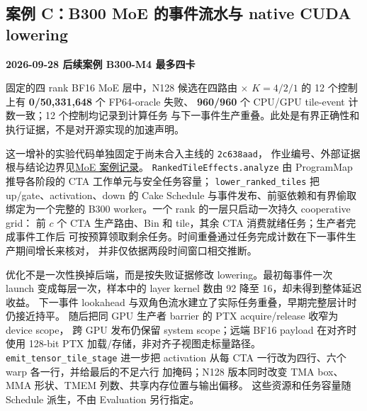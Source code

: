 \documentclass[UTF8,11pt,a4paper,fontset=none]{ctexart}
\newcommand{\code}[1]{\texttt{#1}}
\newcommand{\weaverepo}[2]{\href{https://github.com/qhy991/open-cake-ir/blob/93d052021cc3b4b0d8a5580837f7d87bbbd2fc02/#1}{#2}}
\begin{document}
\subsection{案例 C：B300 MoE 的事件流水与 native CUDA lowering}\label{sec:weave-case}
\begin{notebox}
\noindent\textbf{2026-09-28 后续案例 \quad B300-M4 \quad 最多四卡}\par
\noindent\small 固定的四 rank BF16 MoE 层中，N128 候选在四路由 $\times$
$K=4/2/1$ 的 12 个控制上有 \textbf{0/50,331,648} 个 FP64-oracle 失败、
\textbf{960/960} 个 CPU/GPU tile-event 计数一致；12 个控制均记录到计算任务
与下一事件生产重叠。此处是有界正确性和执行证据，不是对开源实现的加速声明。
\end{notebox}

这一增补的实验代码单独固定于尚未合入主线的 \code{2c638aad}，
作业编号、外部证据根与结论边界见\weaverepo{docs/WEAVE_CASE_STUDY.md}{MoE 案例记录}。
\code{RankedTileEffects.analyze}
由 ProgramMap 推导各阶段的 CTA 工作单元与安全任务容量；
\code{lower\_ranked\_tiles}
把 up/gate、activation、down 的 Cake Schedule 与事件发布、前驱依赖和有界偷取
绑定为一个完整的 B300 worker。一个 rank 的一层只启动一次持久 cooperative grid：
前 $c$ 个 CTA 生产路由、Bin 和 tile，其余 CTA 消费就绪任务；生产者完成事件工作后
可按预算领取剩余任务。时间重叠通过任务完成计数在下一事件生产期间增长来核对，
并非仅依据两段时间窗口相交推断。

优化不是一次性换掉后端，而是按失败证据修改 lowering。最初每事件一次 launch
变成每层一次，样本中的 layer kernel 数由 92 降至 16，却未得到整体延迟收益。
下一事件 lookahead 与双角色流水建立了实际任务重叠，早期完整层计时仍接近持平。
随后把同 GPU 生产者 barrier 的 PTX acquire/release 收窄为 device scope，
跨 GPU 发布仍保留 system scope；远端 BF16 payload 在对齐时使用 128-bit PTX
加载/存储，非对齐子视图走标量路径。\code{emit\_tensor\_tile\_stage}
进一步把 activation 从每 CTA 一行改为四行、六个 warp 各一行，并给最后的不足六行
加掩码；N128 版本同时改变 TMA box、MMA 形状、TMEM 列数、共享内存位置与输出偏移。
这些资源和任务容量随 Schedule 派生，不由 Evaluation 另行指定。
\end{document}
